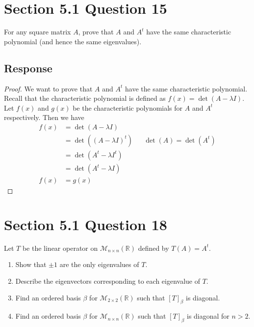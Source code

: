 \documentclass[13pt]{article}
\begin{document}
\newpage
\section*{Section 5.1 Question 15}
For any square matrix $A$, prove that $A$ and $A^t$ have the same characteristic polynomial (and hence the same eigenvalues).

\subsection*{Response}
\begin{proof}
  We want to prove that $A$ and $A^t$ have the same characteristic polynomial. Recall that the characteristic polynomial is defined as $f(x) = \det(A - \lambda I)$. Let $f(x)$ and $g(x)$ be the characteristic polynomials for $A$ and $A^t$ respectively. Then we have
  \begin{align*}
    f(x) &= \det(A - \lambda I) \\
         &= \det((A - \lambda I)^t) && \det(A) = \det(A^t) \\
         &= \det(A^t - \lambda I^t) \\
         &= \det(A^t - \lambda I) \\
    f(x) &= g(x)
  \end{align*}
\end{proof}





\newpage
\section*{Section 5.1 Question 18}
Let $T$ be the linear operator on $\mathcal{M}_{n \times n}(\mathbb{R})$ defined by $T(A) = A^t$.
\begin{enumerate}[label=(\alph*),leftmargin=*]
\item Show that $\pm 1$ are the only eigenvalues of $T$.
\item Describe the eigenvectors corresponding to each eigenvalue of $T$.
\item Find an ordered basis $\beta$ for $\mathcal{M}_{2 \times 2}(\mathbb{R})$ such that $[T]_\beta$ is diagonal.
\item Find an ordered basis $\beta$ for $\mathcal{M}_{n \times n}(\mathbb{R})$ such that $[T]_\beta$ is diagonal for $n > 2$.
\end{enumerate}
\end{document}
